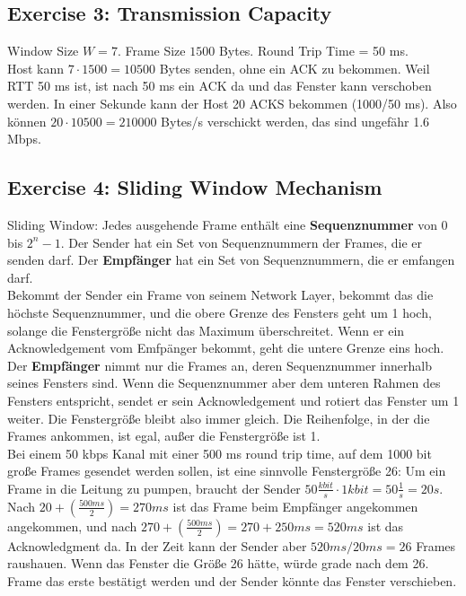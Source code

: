 \documentclass[10pt,a4paper]{scrartcl}
\begin{document}
\subsection*{Exercise 3: Transmission Capacity}
Window Size $W=7$. Frame Size $1500$ Bytes. Round Trip Time = 50 ms.\\
Host kann $7 \cdot 1500 = 10500$ Bytes senden, ohne ein ACK zu bekommen. Weil RTT 50 ms ist, ist nach 50 ms ein ACK da und das Fenster kann verschoben werden. In einer Sekunde kann der Host 20 ACKS bekommen (1000/50 ms). Also können $20\cdot 10500=210000$ Bytes/s verschickt werden, das sind ungefähr 1.6 Mbps.

\subsection*{Exercise 4: Sliding Window Mechanism}
Sliding Window: Jedes ausgehende Frame enthält eine \textbf{Sequenznummer} von 0 bis $2^n-1$. Der Sender hat ein Set von Sequenznummern der Frames, die er senden darf. Der \textbf{Empfänger} hat ein Set von Sequenznummern, die er emfangen darf.\\
Bekommt der Sender ein Frame von seinem Network Layer, bekommt das die höchste Sequenznummer, und die obere Grenze des Fensters geht um 1 hoch, solange die Fenstergröße nicht das Maximum überschreitet. Wenn er ein Acknowledgement vom Emfpänger bekommt, geht die untere Grenze eins hoch.\\
Der \textbf{Empfänger} nimmt nur die Frames an, deren Sequenznummer innerhalb seines Fensters sind. Wenn die Sequenznummer aber dem unteren Rahmen des Fensters entspricht, sendet er sein Acknowledgement und rotiert das Fenster um 1 weiter. Die Fenstergröße bleibt also immer gleich. Die Reihenfolge, in der die Frames ankommen, ist egal, außer die Fenstergröße ist 1. \\

Bei einem 50 kbps Kanal mit einer 500 ms round trip time, auf dem 1000 bit große Frames gesendet werden sollen, ist eine sinnvolle Fenstergröße 26: Um ein Frame in die Leitung zu pumpen, braucht der Sender $50 \frac{kbit}{s}\cdot 1 kbit = 50 \frac{1}{s} = 20 s$. Nach $20+(\frac{500 ms}{2})=270 ms$ ist das Frame beim Empfänger angekommen angekommen, und nach $270+(\frac{500 ms}{2}) = 270+250 ms = 520 ms$ ist das Acknowledgment da. In der Zeit kann der Sender aber $520ms /20 ms = 26$ Frames raushauen. Wenn das Fenster die Größe 26 hätte, würde grade nach dem 26. Frame das erste bestätigt werden und der Sender könnte das Fenster verschieben. \\
\end{document}
